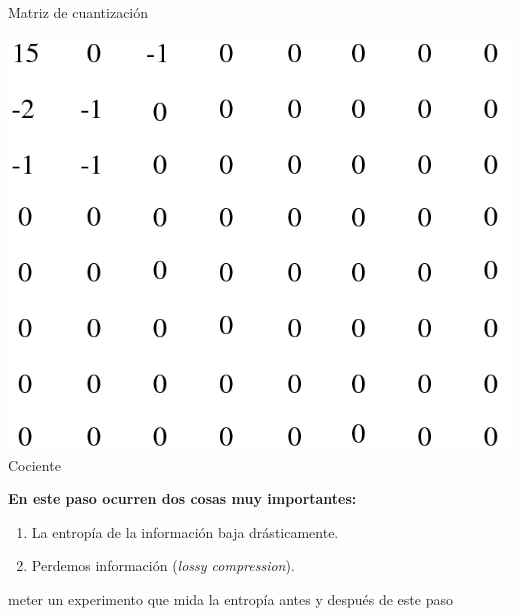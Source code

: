 \documentclass{beamer}
\begin{document}
\begin{frame}
\begin{minipage}[t]{0.3\linewidth}
\begin{center}
            \small Matriz de cuantización
        \end{center}    \end{minipage}
    \hfill
    \begin{minipage}[t]{0.3\linewidth}
        \begin{center}
            \includegraphics[scale=0.175]{fig/quantized.png}\\
            \small Cociente
        \end{center}    \end{minipage}


\end{frame}


\begin{frame}
    \textbf{En este paso ocurren dos cosas muy importantes:}
    \begin{enumerate}
        \item La entropía de la información baja drásticamente.
        \item Perdemos información (\textit{lossy compression}).
    \end{enumerate}
\end{frame}

\begin{frame}
    meter un experimento que mida la entropía antes y después de este paso
\end{frame}
\end{document}
